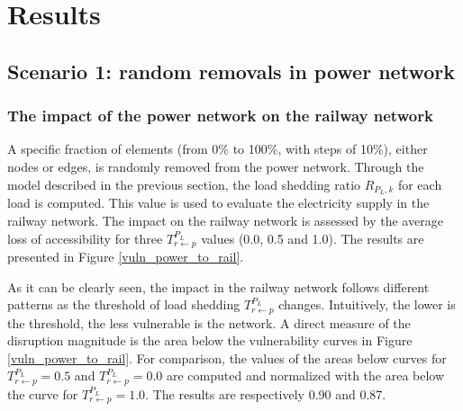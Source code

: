 \documentclass[review]{elsarticle}
\begin{document}
	
	\section{Results}
	\subsection{Scenario 1: random removals in power network}
	\subsubsection{The impact of the power network on the railway network}
	
	A specific fraction of elements (from 0\% to 100\%, with steps of 10\%), either nodes or edges, is randomly removed from the power network. Through the model described in the previous section, the load shedding ratio $R_{P_L,k}$ for each load is computed. This value is used to evaluate the electricity supply in the railway network. The impact on the railway network is assessed by the average loss of accessibility for three $T_{r \leftarrow p}^{P_L}$ values (0.0, 0.5 and 1.0). The results are presented in Figure \ref{vuln_power_to_rail}.
	
	As it can be clearly seen, the impact in the railway network follows different patterns as the threshold of load shedding $T_{r \leftarrow p}^{P_L}$ changes. Intuitively, the lower is the threshold, the less vulnerable is the network. A direct measure of the disruption magnitude is the area below the vulnerability curves in Figure \ref{vuln_power_to_rail}. For comparison, the values of the areas below curves for $T_{r \leftarrow p}^{P_L}=0.5$ and $T_{r \leftarrow p}^{P_L}=0.0$ are computed and normalized with the area below the curve for $T_{r \leftarrow p}^{P_L}=1.0$. The results are respectively 0.90 and 0.87.
	
\end{document}
